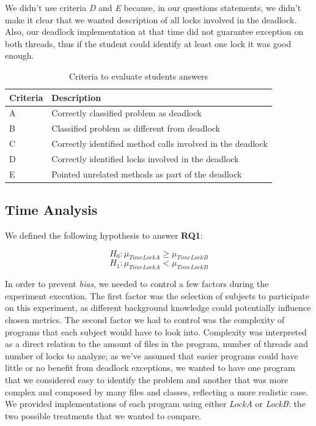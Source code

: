 We didn't use criteria \emph{D} and \emph{E} because, in our questions statements,
we didn't make it clear that we wanted description of all locks involved in the deadlock.
Also, our deadlock implementation at that time did not guarantee exception on both threads,
thus if the student could identify at least one lock it was good enough.

\begin{table}
\begin{center}
\caption{Criteria to evaluate students answers}\label{tab:crit}
\begin{tabular}{|l|l|}
\hline
Criteria & Description \\
\hline
A & Correctly classified problem as deadlock \\
B & Classified problem as different from deadlock  \\
C & Correctly identified method calls involved in the deadlock \\
D & Correctly identified locks involved in the deadlock  \\
E & Pointed unrelated methods as part of the deadlock \\
\hline
\end{tabular}
\end{center}
\end{table}

\subsection{Time Analysis}

We defined the following hypothesis to answer {\bf RQ1}:

\begin{equation}
  H_{0} : \mu_{TimeLockA} \geq \mu_{TimeLockB}
\end{equation}
\begin{equation}
  H_{1} : \mu_{TimeLockA} < \mu_{TimeLockB}
\end{equation}

In order to prevent \emph{bias}, we needed to control a few factors during the experiment execution.
The first factor was the selection of subjects to participate on this experiment, as different background knowledge could potentially influence chosen metrics.
The second factor we had to control was the complexity of programs that each subject would have to look into.
Complexity was interpreted as a direct relation to the amount of files in the program, number of threads and number of locks to analyze;
as we've assumed that easier programs could have little or no benefit from deadlock exceptions,
we wanted to have one program that we considered easy to identify the problem and another that was more complex and composed by many files and classes,
reflecting a more realistic case.
We provided implementations of each program using either \emph{LockA} or \emph{LockB}: the two possible treatments that we wanted to compare.

